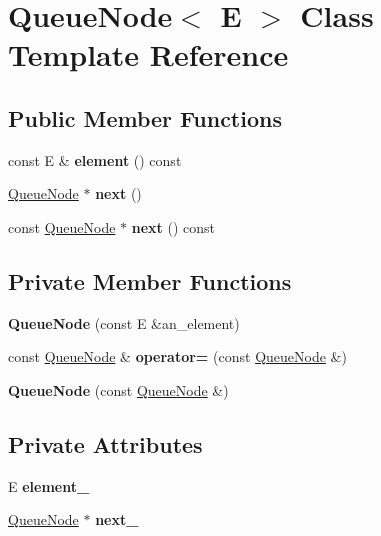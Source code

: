 \hypertarget{class_queue_node}{}\section{Queue\+Node$<$ E $>$ Class Template Reference}
\label{class_queue_node}
\subsection*{Public Member Functions}
\begin{DoxyCompactItemize}
\item 
\mbox{\label{class_queue_node_a1c61b3ed32e089f5901b87022ef84985}} 
const E \& {\bfseries element} () const
\item 
\mbox{\label{class_queue_node_a8a9fdf488da06533360999ef85db56ea}} 
\mbox{\hyperlink{class_queue_node}{Queue\+Node}} $\ast$ {\bfseries next} ()
\item 
\mbox{\label{class_queue_node_ada477e4f309f29383112dbda473dd985}} 
const \mbox{\hyperlink{class_queue_node}{Queue\+Node}} $\ast$ {\bfseries next} () const
\end{DoxyCompactItemize}
\subsection*{Private Member Functions}
\begin{DoxyCompactItemize}
\item 
\mbox{\label{class_queue_node_a2c22feef35d910bec7138598e8784e25}} 
{\bfseries Queue\+Node} (const E \&an\+\_\+element)
\item 
\mbox{\label{class_queue_node_a8635bbe6310e011ef4fcf1a01566dbb7}} 
const \mbox{\hyperlink{class_queue_node}{Queue\+Node}} \& {\bfseries operator=} (const \mbox{\hyperlink{class_queue_node}{Queue\+Node}} \&)
\item 
\mbox{\label{class_queue_node_a35adcad7a84db46784907cf58106d585}} 
{\bfseries Queue\+Node} (const \mbox{\hyperlink{class_queue_node}{Queue\+Node}} \&)
\end{DoxyCompactItemize}
\subsection*{Private Attributes}
\begin{DoxyCompactItemize}
\item 
\mbox{\label{class_queue_node_a593f0f5862848c1e9063d32ea3438b58}} 
E {\bfseries element\+\_\+}
\item 
\mbox{\label{class_queue_node_a7434603f6c25418f7810f041752876bd}} 
\mbox{\hyperlink{class_queue_node}{Queue\+Node}} $\ast$ {\bfseries next\+\_\+}
\end{DoxyCompactItemize}

